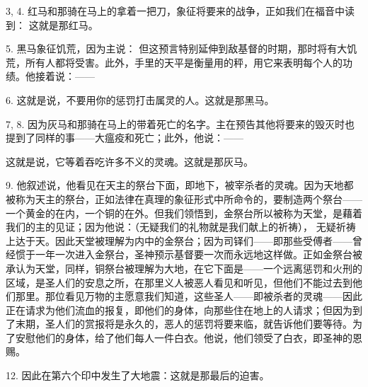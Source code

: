 3, 4.  红马和那骑在马上的拿着一把刀，象征将要来的战争，正如我们在福音中读到： 这就是那红马。\par

5.  黑马象征饥荒，因为主说： 但这预言特别延伸到敌基督的时期，那时将有大饥荒，所有人都将受害。此外，手里的天平是衡量用的秤，用它来表明每个人的功绩。他接着说：——\par

6.  这就是说，不要用你的惩罚打击属灵的人。这就是那黑马。\par

7, 8.  因为灰马和那骑在马上的带着死亡的名字。主在预告其他将要来的毁灭时也提到了同样的事——大瘟疫和死亡；此外，他说：——\par

 这就是说，它等着吞吃许多不义的灵魂。这就是那灰马。\par

9.  他叙述说，他看见在天主的祭台下面，即地下，被宰杀者的灵魂。因为天地都被称为天主的祭台，正如法律在真理的象征形式中所命令的，要制造两个祭台——一个黄金的在内，一个铜的在外。但我们领悟到，金祭台所以被称为天堂，是藉着我们的主的见证；因为他说：（无疑我们的礼物就是我们献上的祈祷）， 无疑祈祷上达于天。因此天堂被理解为内中的金祭台；因为司铎们——即那些受傅者——曾经惯于一年一次进入金祭台，圣神预示基督要一次而永远地这样做。正如金祭台被承认为天堂，同样，铜祭台被理解为大地，在它下面是——一个远离惩罚和火刑的区域，是圣人们的安息之所，在那里义人被恶人看见和听见，但他们不能过去到他们那里。那位看见万物的主愿意我们知道，这些圣人——即被杀者的灵魂——因此正在请求为他们流血的报复，即他们的身体，向那些住在地上的人请求；但因为到了末期，圣人们的赏报将是永久的，恶人的惩罚将要来临，就告诉他们要等待。为了安慰他们的身体，给了他们每人一件白衣。他说，他们领受了白衣，即圣神的恩赐。\par

12.  因此在第六个印中发生了大地震：这就是那最后的迫害。\par

